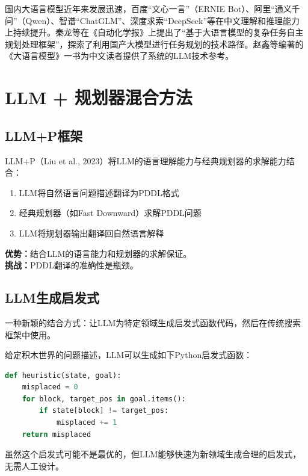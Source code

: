 \begin{remark}
国内大语言模型近年来发展迅速，百度``文心一言''（ERNIE Bot）、阿里``通义千问''（Qwen）、智谱``ChatGLM''、深度求索``DeepSeek''等在中文理解和推理能力上持续提升。秦龙等在《自动化学报》上提出了``基于大语言模型的复杂任务自主规划处理框架''，探索了利用国产大模型进行任务规划的技术路径。赵鑫等编著的《大语言模型》一书为中文读者提供了系统的LLM技术参考。
\end{remark}

\section{LLM + 规划器混合方法 \grad}

\subsection{LLM+P框架}

LLM+P（Liu et al., 2023）将LLM的语言理解能力与经典规划器的求解能力结合：

\begin{algbox}[title={\textbf{LLM+P工作流程}}]
\begin{enumerate}
  \item LLM将自然语言问题描述翻译为PDDL格式
  \item 经典规划器（如Fast Downward）求解PDDL问题
  \item LLM将规划器输出翻译回自然语言解释
\end{enumerate}
\textbf{优势：}结合LLM的语言能力和规划器的求解保证。\\
\textbf{挑战：}PDDL翻译的准确性是瓶颈。
\end{algbox}

\subsection{LLM生成启发式}

一种新颖的结合方式：让LLM为特定领域生成启发式函数代码，然后在传统搜索框架中使用。

\begin{example}[LLM生成的启发式]
给定积木世界的问题描述，LLM可以生成如下Python启发式函数：
\begin{lstlisting}[language=Python]
def heuristic(state, goal):
    misplaced = 0
    for block, target_pos in goal.items():
        if state[block] != target_pos:
            misplaced += 1
    return misplaced
\end{lstlisting}
虽然这个启发式可能不是最优的，但LLM能够快速为新领域生成合理的启发式，无需人工设计。
\end{example}

